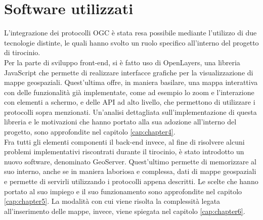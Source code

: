 \section{Software utilizzati}

L'integrazione dei protocolli OGC è stata resa possibile mediante l'utilizzo di due tecnologie distinte, le quali hanno svolto un ruolo specifico all'interno del progetto di tirocinio.
\\Per la parte di sviluppo front-end, si è fatto uso di OpenLayers, una libreria JavaScript che permette di realizzare interfacce grafiche per la visualizzazione di mappe geospaziali. Quest'ultima offre, in maniera basilare, una mappa interattiva con delle funzionalità già implementate, come ad esempio lo zoom e l'interazione con elementi a schermo, e delle API ad alto livello, che permettono di utilizzare i protocolli sopra menzionati. Un'analisi dettagliata sull'implementazione di questa libreria e le motivazioni che hanno portato alla sua adozione all'interno del progetto, sono approfondite nel capitolo \ref{cap:chapter4}.
\\Fra tutti gli elementi componenti il back-end invece, al fine di risolvere alcuni problemi implementativi riscontrati durante il tirocinio, è stato introdotto un nuovo software, denominato GeoServer. Quest'ultimo permette di memorizzare al suo interno, anche se in maniera laboriosa e complessa, dati di mappe geospaziali e permette di servirli utilizzando i protocolli appena descritti. Le scelte che hanno portato al suo impiego e il suo funzionamento sono approfondite nel capitolo \ref{cap:chapter5}. La modalità con cui viene risolta la complessità legata all'inserimento delle mappe, invece, viene spiegata nel capitolo \ref{cap:chapter6}.
